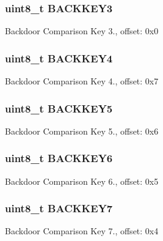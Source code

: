 \subsubsection[{B\+A\+C\+K\+K\+E\+Y3}]{\setlength{\rightskip}{0pt plus 5cm}uint8\+\_\+t B\+A\+C\+K\+K\+E\+Y3}\label{struct_n_v___mem_map_a3f146f3eeb245a4d378e7e6a2f234349}
Backdoor Comparison Key 3., offset\+: 0x0 \hypertarget{struct_n_v___mem_map_a9a43e7976425f84579a52c12781561fd}{}
\subsubsection[{B\+A\+C\+K\+K\+E\+Y4}]{\setlength{\rightskip}{0pt plus 5cm}uint8\+\_\+t B\+A\+C\+K\+K\+E\+Y4}\label{struct_n_v___mem_map_a9a43e7976425f84579a52c12781561fd}
Backdoor Comparison Key 4., offset\+: 0x7 \hypertarget{struct_n_v___mem_map_a7442554ca5dc002527eb44b050e5979e}{}
\subsubsection[{B\+A\+C\+K\+K\+E\+Y5}]{\setlength{\rightskip}{0pt plus 5cm}uint8\+\_\+t B\+A\+C\+K\+K\+E\+Y5}\label{struct_n_v___mem_map_a7442554ca5dc002527eb44b050e5979e}
Backdoor Comparison Key 5., offset\+: 0x6 \hypertarget{struct_n_v___mem_map_a1013f00646e083a56b2b3151e74d1b45}{}
\subsubsection[{B\+A\+C\+K\+K\+E\+Y6}]{\setlength{\rightskip}{0pt plus 5cm}uint8\+\_\+t B\+A\+C\+K\+K\+E\+Y6}\label{struct_n_v___mem_map_a1013f00646e083a56b2b3151e74d1b45}
Backdoor Comparison Key 6., offset\+: 0x5 \hypertarget{struct_n_v___mem_map_ae5371d47bf462c2d4f2f808ae26fe983}{}
\subsubsection[{B\+A\+C\+K\+K\+E\+Y7}]{\setlength{\rightskip}{0pt plus 5cm}uint8\+\_\+t B\+A\+C\+K\+K\+E\+Y7}\label{struct_n_v___mem_map_ae5371d47bf462c2d4f2f808ae26fe983}
Backdoor Comparison Key 7., offset\+: 0x4 \hypertarget{struct_n_v___mem_map_ad136314504ac1baf93f6254b0ac13ee6}{}
